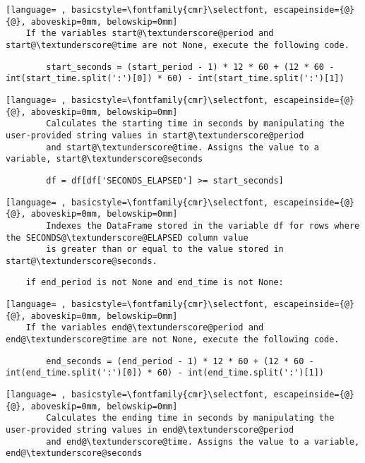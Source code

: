 \documentclass{article}
\begin{document}
\begin{lstlisting}[language= , basicstyle=\fontfamily{cmr}\selectfont, escapeinside={@}{@}, aboveskip=0mm, belowskip=0mm]
    If the variables start@\textunderscore@period and start@\textunderscore@time are not None, execute the following code.
\end{lstlisting}
\begin{lstlisting}
        start_seconds = (start_period - 1) * 12 * 60 + (12 * 60 - int(start_time.split(':')[0]) * 60) - int(start_time.split(':')[1])
\end{lstlisting}
\begin{lstlisting}[language= , basicstyle=\fontfamily{cmr}\selectfont, escapeinside={@}{@}, aboveskip=0mm, belowskip=0mm]
        Calculates the starting time in seconds by manipulating the user-provided string values in start@\textunderscore@period
        and start@\textunderscore@time. Assigns the value to a variable, start@\textunderscore@seconds
\end{lstlisting}
\begin{lstlisting}
        df = df[df['SECONDS_ELAPSED'] >= start_seconds]
\end{lstlisting}
\begin{lstlisting}[language= , basicstyle=\fontfamily{cmr}\selectfont, escapeinside={@}{@}, aboveskip=0mm, belowskip=0mm]
        Indexes the DataFrame stored in the variable df for rows where the SECONDS@\textunderscore@ELAPSED column value
        is greater than or equal to the value stored in start@\textunderscore@seconds.
\end{lstlisting}
\begin{lstlisting}
    if end_period is not None and end_time is not None:
\end{lstlisting}
\begin{lstlisting}[language= , basicstyle=\fontfamily{cmr}\selectfont, escapeinside={@}{@}, aboveskip=0mm, belowskip=0mm]
    If the variables end@\textunderscore@period and end@\textunderscore@time are not None, execute the following code.
\end{lstlisting}
\begin{lstlisting}
        end_seconds = (end_period - 1) * 12 * 60 + (12 * 60 - int(end_time.split(':')[0]) * 60) - int(end_time.split(':')[1])
\end{lstlisting}
\begin{lstlisting}[language= , basicstyle=\fontfamily{cmr}\selectfont, escapeinside={@}{@}, aboveskip=0mm, belowskip=0mm]
        Calculates the ending time in seconds by manipulating the user-provided string values in end@\textunderscore@period
        and end@\textunderscore@time. Assigns the value to a variable, end@\textunderscore@seconds
\end{lstlisting}
\end{document}
